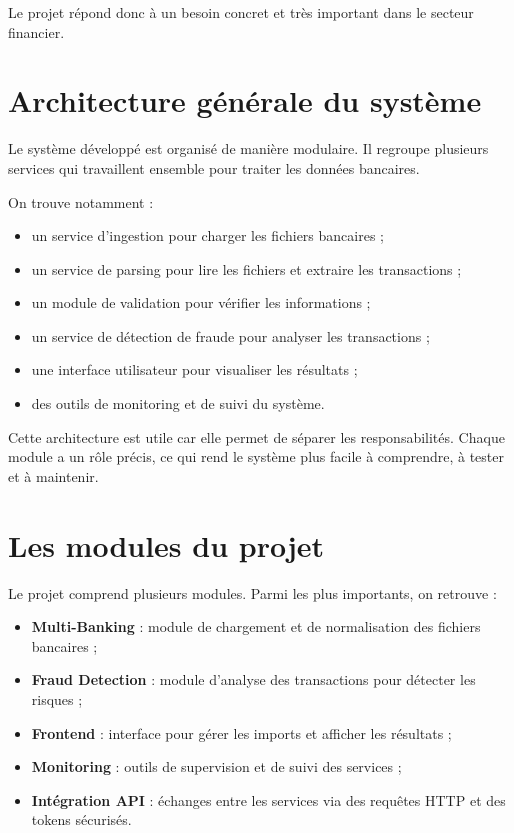 ﻿\documentclass[12pt,a4paper]{report}
\begin{document}
Le projet répond donc à un besoin concret et très important dans le secteur financier.

\section{Architecture générale du système}
Le système développé est organisé de manière modulaire. Il regroupe plusieurs services qui travaillent ensemble pour traiter les données bancaires.

On trouve notamment :
\begin{itemize}[leftmargin=1.5em]
    \item un service d'ingestion pour charger les fichiers bancaires ;
    \item un service de parsing pour lire les fichiers et extraire les transactions ;
    \item un module de validation pour vérifier les informations ;
    \item un service de détection de fraude pour analyser les transactions ;
    \item une interface utilisateur pour visualiser les résultats ;
    \item des outils de monitoring et de suivi du système.
\end{itemize}

Cette architecture est utile car elle permet de séparer les responsabilités. Chaque module a un rôle précis, ce qui rend le système plus facile à comprendre, à tester et à maintenir.

\section{Les modules du projet}
Le projet comprend plusieurs modules. Parmi les plus importants, on retrouve :
\begin{itemize}[leftmargin=1.5em]
    \item \textbf{Multi-Banking} : module de chargement et de normalisation des fichiers bancaires ;
    \item \textbf{Fraud Detection} : module d'analyse des transactions pour détecter les risques ;
    \item \textbf{Frontend} : interface pour gérer les imports et afficher les résultats ;
    \item \textbf{Monitoring} : outils de supervision et de suivi des services ;
    \item \textbf{Intégration API} : échanges entre les services via des requêtes HTTP et des tokens sécurisés.
\end{itemize}
\end{document}
